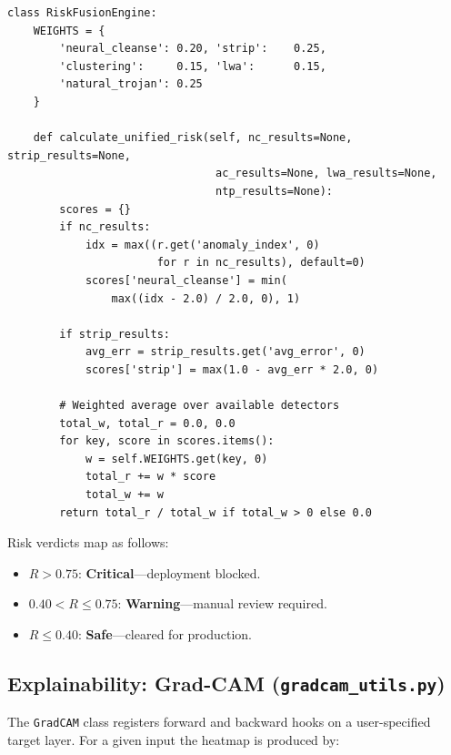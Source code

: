 \documentclass[12pt, letterpaper]{article}
\begin{document}
\begin{singlespace}
\begin{lstlisting}[style=pystyle, caption={\texttt{RiskFusionEngine}: static
  weighted-average fusion of detector risk scores (\texttt{defenses.py}).},
  label=lst:fusion]
class RiskFusionEngine:
    WEIGHTS = {
        'neural_cleanse': 0.20, 'strip':    0.25,
        'clustering':     0.15, 'lwa':      0.15,
        'natural_trojan': 0.25
    }

    def calculate_unified_risk(self, nc_results=None, strip_results=None,
                                ac_results=None, lwa_results=None,
                                ntp_results=None):
        scores = {}
        if nc_results:
            idx = max((r.get('anomaly_index', 0)
                       for r in nc_results), default=0)
            scores['neural_cleanse'] = min(
                max((idx - 2.0) / 2.0, 0), 1)

        if strip_results:
            avg_err = strip_results.get('avg_error', 0)
            scores['strip'] = max(1.0 - avg_err * 2.0, 0)

        # Weighted average over available detectors
        total_w, total_r = 0.0, 0.0
        for key, score in scores.items():
            w = self.WEIGHTS.get(key, 0)
            total_r += w * score
            total_w += w
        return total_r / total_w if total_w > 0 else 0.0
\end{lstlisting}
\end{singlespace}

Risk verdicts map as follows:
\begin{itemize}
  \item $R > 0.75$: \textbf{Critical}---deployment blocked.
  \item $0.40 < R \leq 0.75$: \textbf{Warning}---manual review required.
  \item $R \leq 0.40$: \textbf{Safe}---cleared for production.
\end{itemize}

\subsection{Explainability: Grad-CAM (\texttt{gradcam\_utils.py})}
\label{subsec:gradcam}

The \texttt{GradCAM} class registers forward and backward hooks on a
user-specified target layer.  For a given input the heatmap is produced by:
\end{document}
